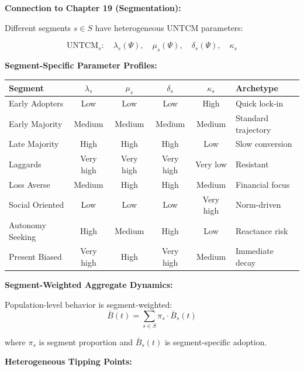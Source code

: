 \begin{tcolorbox}[colback=red!5!white, colframe=red!75!black,
    title=\textbf{Integration UNTCM-I4: Segment Heterogeneity}]

\textbf{Connection to Chapter 19 (Segmentation):}

Different segments $s \in S$ have heterogeneous UNTCM parameters:

\begin{equation}
\boxed{
\text{UNTCM}_s: \quad \lambda_s(\Psi), \quad \mu_s(\Psi), \quad \delta_s(\Psi), \quad \kappa_s
}
\label{eq:untcm-segment}
\end{equation}

\textbf{Segment-Specific Parameter Profiles:}

\begin{center}
\renewcommand{\arraystretch}{1.3}
\begin{tabular}{@{}lccccl@{}}
\toprule
\textbf{Segment} & $\lambda_s$ & $\mu_s$ & $\delta_s$ & $\kappa_s$ & \textbf{Archetype} \\
\midrule
Early Adopters & Low & Low & Low & High & Quick lock-in \\
Early Majority & Medium & Medium & Medium & Medium & Standard trajectory \\
Late Majority & High & High & High & Low & Slow conversion \\
Laggards & Very high & Very high & Very high & Very low & Resistant \\
\midrule
Loss Averse & Medium & High & High & Medium & Financial focus \\
Social Oriented & Low & Low & Low & Very high & Norm-driven \\
Autonomy Seeking & High & Medium & High & Low & Reactance risk \\
Present Biased & Very high & High & Very high & Medium & Immediate decay \\
\bottomrule
\end{tabular}
\end{center}

\textbf{Segment-Weighted Aggregate Dynamics:}

Population-level behavior is segment-weighted:
\begin{equation}
\bar{B}(t) = \sum_{s \in S} \pi_s \cdot \bar{B}_s(t)
\end{equation}

where $\pi_s$ is segment proportion and $\bar{B}_s(t)$ is segment-specific adoption.

\textbf{Heterogeneous Tipping Points:}


\end{tcolorbox}
